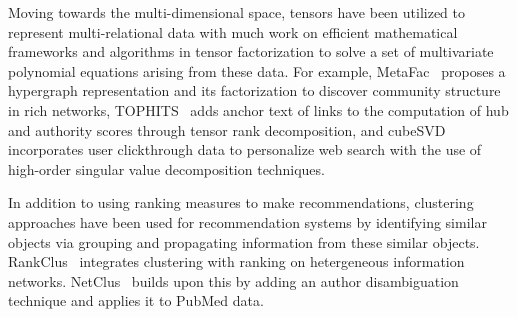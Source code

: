 Moving towards the multi-dimensional space, tensors have been utilized to represent multi-relational data with much work on efficient mathematical frameworks and algorithms in tensor factorization to solve a set of multivariate polynomial equations arising from these data. For example, MetaFac~\cite{lin2009metafac} proposes a hypergraph representation and its factorization to discover community structure in rich networks, TOPHITS~\cite{kolda2006tophits} adds anchor text of links to the computation of hub and authority scores through tensor rank decomposition, and cubeSVD~\cite{sun2005cubesvd} incorporates user clickthrough data to personalize web search with the use of high-order singular value decomposition techniques. 


    \begin{table}[h]
    \centering
    \caption{Summary of Related Work based on Feature vs. Network Property}
    \label{tab:related}
    \end{table}


In addition to using ranking measures to make recommendations, clustering approaches have been used for recommendation systems by identifying similar objects via grouping and propagating information from these similar objects. RankClus~\cite{sun2009rankclus} integrates clustering with ranking on hetergeneous information networks. NetClus~\cite{varadharajalu2011author} builds upon this by adding an author disambiguation technique and applies it to PubMed data.

